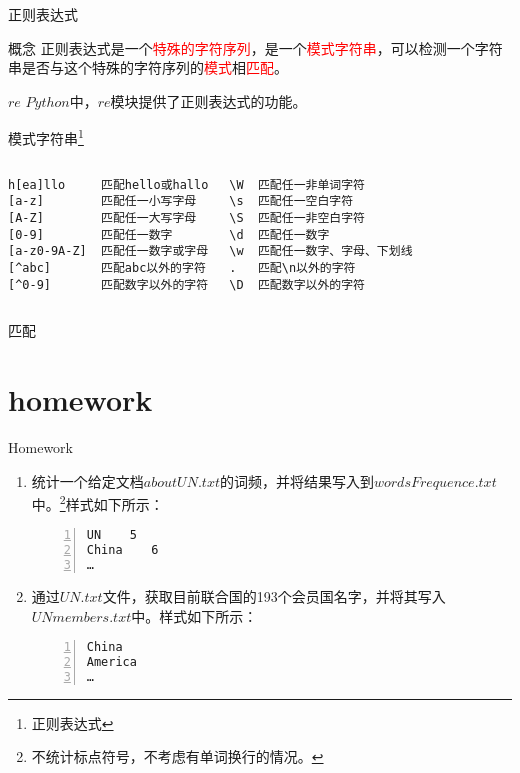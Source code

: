\documentclass{beamer}
\begin{document}
\begin{frame}{正则表达式}
\begin{block}{概念}
正则表达式是一个\textcolor{red}{特殊的字符序列}，是一个\textcolor{red}{模式字符串}，可以检测一个字符串是否与这个特殊的字符序列的\textcolor{red}{模式}相\textcolor{red}{匹配}。
\end{block}
\begin{block}{$re$}
$Python$中，$re$模块提供了正则表达式的功能。
\end{block}
\end{frame}
\begin{frame}[fragile]{模式字符串\footnote{正则表达式}}
\small{
\begin{columns}
\begin{Verbatim}[numbers=none,frame=none,rulecolor=\color{red}]
h[ea]llo     匹配hello或hallo
[a-z]        匹配任一小写字母
[A-Z]        匹配任一大写字母
[0-9]        匹配任一数字
[a-z0-9A-Z]  匹配任一数字或字母
[^abc]       匹配abc以外的字符
[^0-9]       匹配数字以外的字符
\end{Verbatim}

\begin{Verbatim}[numbers=none,frame=none,rulecolor=\color{red}]
\W  匹配任一非单词字符
\s  匹配任一空白字符
\S  匹配任一非空白字符
\d  匹配任一数字
\w  匹配任一数字、字母、下划线
.   匹配\n以外的字符
\D  匹配数字以外的字符
\end{Verbatim}
\end{columns}
}
\end{frame}
\begin{frame}{匹配}
\end{frame}
\section{homework}
\begin{frame}[fragile]{Homework}

\begin{enumerate}
\item
统计一个给定文档$aboutUN.txt$的词频，并将结果写入到$wordsFrequence.txt$中。\footnote{不统计标点符号，不考虑有单词换行的情况。}样式如下所示：
\begin{Verbatim}[numbers=left,frame=single,rulecolor=\color{red}]
UN    5
China    6
…
\end{Verbatim}
\item
通过$UN.txt$文件，获取目前联合国的193个会员国名字，并将其写入$UNmembers.txt$中。样式如下所示：
\begin{Verbatim}[numbers=left,frame=single,rulecolor=\color{red}]
China
America
…
\end{Verbatim}
\end{enumerate}
\end{frame}
\end{document}
